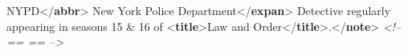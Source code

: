 \begin{shaded}
\hspace*{1em}\hspace*{1em}\hspace*{1em}\hspace*{1em}NYPD{</\textbf{abbr}>}\mbox{}\newline 
\hspace*{1em}\hspace*{1em}\hspace*{1em}\hspace*{1em}New York Police\mbox{}\newline 
\hspace*{1em}\hspace*{1em}\hspace*{1em}\hspace*{1em}\hspace*{1em}\hspace*{1em}\hspace*{1em}\hspace*{1em}\hspace*{1em}\hspace*{1em} Department{</\textbf{expan}>}\mbox{}\newline 
\hspace*{1em}\hspace*{1em}\hspace*{1em} Detective regularly appearing\mbox{}\newline 
\hspace*{1em}\hspace*{1em}\hspace*{1em}\hspace*{1em}\hspace*{1em}\hspace*{1em} in seasons 15 \& 16 of {<\textbf{title}>}Law and Order{</\textbf{title}>}.{</\textbf{note}>}\mbox{}\newline 
\hspace*{1em}\mbox{}\newline 
{}\mbox{}\newline 
\textit{<!-- == == -->}\mbox{}\newline 
{}\mbox{}\newline 

\end{shaded}

